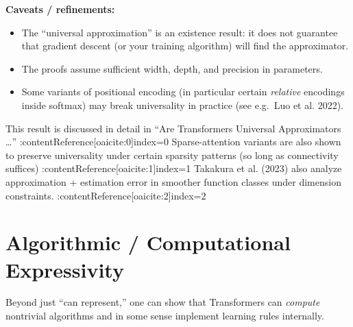 \documentclass[11pt]{article}
\begin{document}
\noindent\textbf{Caveats / refinements:}
\begin{itemize}
  \item The “universal approximation” is an existence result: it does not guarantee that gradient descent (or your training algorithm) will find the approximator.  
  \item The proofs assume sufficient width, depth, and precision in parameters.  
  \item Some variants of positional encoding (in particular certain {\em relative} encodings inside softmax) may break universality in practice (see e.g.\ Luo et al. 2022).  
\end{itemize}

This result is discussed in detail in “Are Transformers Universal Approximators …” :contentReference[oaicite:0]{index=0}  
Sparse-attention variants are also shown to preserve universality under certain sparsity patterns (so long as connectivity suffices) :contentReference[oaicite:1]{index=1}  
Takakura et al. (2023) also analyze approximation + estimation error in smoother function classes under dimension constraints. :contentReference[oaicite:2]{index=2}

\section{Algorithmic / Computational Expressivity}
Beyond just “can represent,” one can show that Transformers can {\em compute} nontrivial algorithms and in some sense implement learning rules internally.
\end{document}

